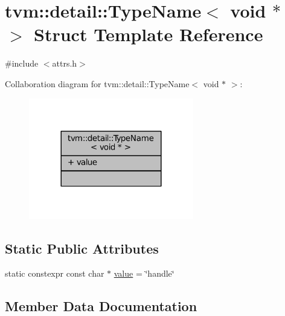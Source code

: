 \hypertarget{structtvm_1_1detail_1_1TypeName_3_01void_01_5_01_4}{}\section{tvm\+:\+:detail\+:\+:Type\+Name$<$ void $\ast$ $>$ Struct Template Reference}
\label{structtvm_1_1detail_1_1TypeName_3_01void_01_5_01_4}


{\ttfamily \#include $<$attrs.\+h$>$}



Collaboration diagram for tvm\+:\+:detail\+:\+:Type\+Name$<$ void $\ast$ $>$\+:
\nopagebreak
\begin{figure}[H]
\begin{center}
\leavevmode
\includegraphics[width=204pt]{structtvm_1_1detail_1_1TypeName_3_01void_01_5_01_4__coll__graph}
\end{center}
\end{figure}
\subsection*{Static Public Attributes}
\begin{DoxyCompactItemize}
\item 
static constexpr const char $\ast$ \hyperlink{structtvm_1_1detail_1_1TypeName_3_01void_01_5_01_4_a05dde8e9fdc15287aa0b1bf8d2e4b584}{value} = \char`\"{}handle\char`\"{}
\end{DoxyCompactItemize}


\subsection{Member Data Documentation}
